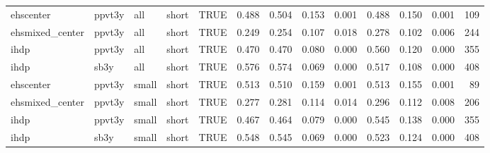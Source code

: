 \begin{table}[ht]
\begin{tabular}{lllllrrrrrrrr}
  ehscenter & ppvt3y & all & short & TRUE & 0.488 & 0.504 & 0.153 & 0.001 & 0.488 & 0.150 & 0.001 & 109 \\ 
  ehsmixed\_center & ppvt3y & all & short & TRUE & 0.249 & 0.254 & 0.107 & 0.018 & 0.278 & 0.102 & 0.006 & 244 \\ 
  ihdp & ppvt3y & all & short & TRUE & 0.470 & 0.470 & 0.080 & 0.000 & 0.560 & 0.120 & 0.000 & 355 \\ 
  ihdp & sb3y & all & short & TRUE & 0.576 & 0.574 & 0.069 & 0.000 & 0.517 & 0.108 & 0.000 & 408 \\ 
  ehscenter & ppvt3y & small & short & TRUE & 0.513 & 0.510 & 0.159 & 0.001 & 0.513 & 0.155 & 0.001 & 89 \\ 
  ehsmixed\_center & ppvt3y & small & short & TRUE & 0.277 & 0.281 & 0.114 & 0.014 & 0.296 & 0.112 & 0.008 & 206 \\ 
  ihdp & ppvt3y & small & short & TRUE & 0.467 & 0.464 & 0.079 & 0.000 & 0.545 & 0.138 & 0.000 & 355 \\ 
  ihdp & sb3y & small & short & TRUE & 0.548 & 0.545 & 0.069 & 0.000 & 0.523 & 0.124 & 0.000 & 408 \\ 
   \hline
\end{tabular}
\end{table}
